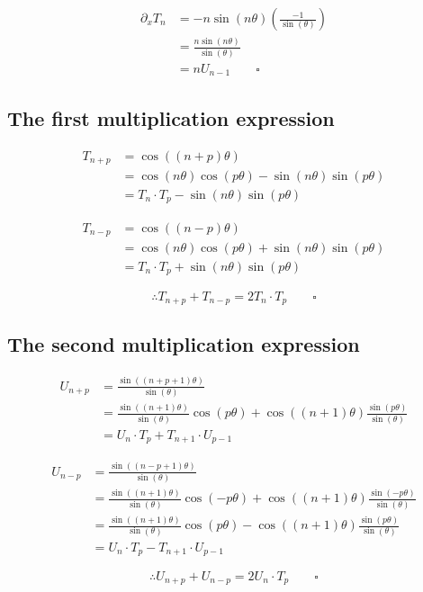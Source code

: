 \documentclass{article}
\begin{document}
\begin{align*}
\partial_x T_n &= -n \sin(n \theta) \left(\frac{-1}{\sin(\theta)}\right) \\
&= \frac{n \sin(n \theta)}{\sin(\theta)} \\
&= n U_{n-1} \quad \quad \square
\end{align*}

\subsection{The first multiplication expression}\label{deriv_mult1}

\begin{align*}
T_{n+p} &= \cos((n+p) \theta) \\
&= \cos(n \theta) \cos(p \theta) - \sin(n \theta) \sin(p \theta) \\
&= T_n \cdot T_p - \sin(n \theta) \sin(p \theta)
\end{align*}

\begin{align*}
T_{n-p} &= \cos((n-p) \theta) \\
&= \cos(n \theta) \cos(p \theta) + \sin(n \theta) \sin(p \theta) \\
&= T_n \cdot T_p + \sin(n \theta) \sin(p \theta)
\end{align*}

\begin{equation*}
\therefore T_{n+p} + T_{n-p} = 2 T_n \cdot T_p \quad \quad \square
\end{equation*}

\subsection{The second multiplication expression}\label{deriv_mult2}

\begin{align*}
U_{n+p} &= \frac{\sin((n+p+1) \theta)}{\sin(\theta)} \\ 
&= \frac{\sin((n+1) \theta)}{\sin(\theta)} \cos(p \theta) + \cos((n+1) \theta) \frac{\sin(p \theta)}{\sin(\theta)} \\ 
&= U_n \cdot T_p + T_{n+1} \cdot U_{p-1}
\end{align*}

\begin{align*}
U_{n-p} &= \frac{\sin((n-p+1) \theta)}{\sin(\theta)} \\ 
&= \frac{\sin((n+1) \theta)}{\sin(\theta)} \cos(-p \theta) + \cos((n+1) \theta) \frac{\sin(-p \theta)}{\sin(\theta)} \\ 
&= \frac{\sin((n+1) \theta)}{\sin(\theta)} \cos(p \theta) - \cos((n+1) \theta) \frac{\sin(p \theta)}{\sin(\theta)} \\ 
&= U_n \cdot T_p - T_{n+1} \cdot U_{p-1}
\end{align*}

\begin{equation*}
\therefore U_{n+p} + U_{n-p} = 2 U_n \cdot T_p \quad \quad \square
\end{equation*}
\end{document}
